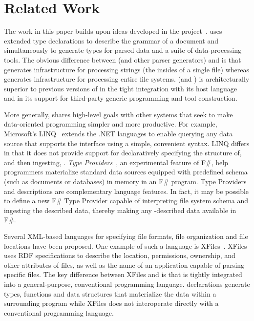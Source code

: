 \section{Related Work}
\label{sec:related}

The work in this paper builds upon ideas developed in the \pads{} 
project~\cite{fisher+:pads,fisher+:toplas}. \pads{} uses extended
type declarations to describe the grammar of a document
and simultaneously to generate types for parsed data and a suite 
of data-processing tools.  The obvious difference between 
\pads{} (and other parser generators) and
\forest{} is that 
\pads{} generates infrastructure for processing strings (the insides
of a single file) whereas \forest{} generates infrastructure for 
processing entire file systems.
\forest{} (and \padshaskell) is architecturally superior to 
previous versions of \pads{} in the tight integration with its host
language and
in its support for third-party generic programming and tool construction.

More generally, \forest{} shares high-level goals with other systems
that seek to make data-oriented programming simpler and more productive.
For example, Microsoft's LINQ~\cite{linq} extends the .NET languages
to enable querying
any data source that supports the  interface using
a simple, convenient syntax.  
LINQ differs in that it does not provide support for
declaratively specifying the structure of, and then ingesting, 
\filestores{}. {\em Type Providers}~\cite{syme+:type-providers}, an
experimental feature 
of F\#, help programmers materialize standard data sources equipped with
predefined schema (such as \xml{} documents or databases) in memory in
an F\# program.  Type Providers and \forest{} descriptions
are complementary language
features.  In fact, it may be possible to define a new F\# Type Provider
capable of interpreting \forest{} file system schema and ingesting
the described data, thereby making any \forest{}-described data available
in F\#.

Several XML-based languages for specifying file formats, file
organization and file locations have been proposed. One example of
such a language is XFiles~\cite{xml-file-sys}.  XFiles uses RDF
specifications to describe the location, permissions, ownership, and
other attributes of files, as well as the name of an application
capable of parsing specific files.  The key difference between XFiles
and \forest{} is that \forest{} is tightly integrated into a
general-purpose, conventional programming language.  \forest{}
declarations generate types, functions and data structures that
materialize the data within a surrounding \haskell{} program while
XFiles does not interoperate directly with a conventional programming
language.

